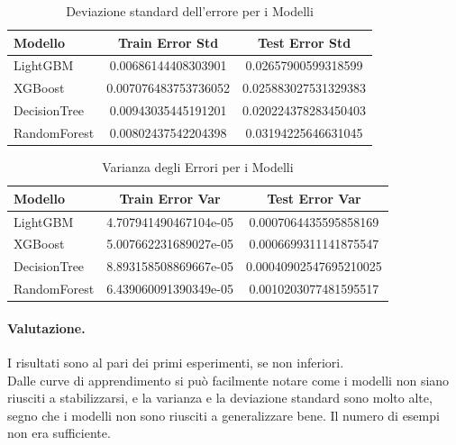 \begin{table}[H]
    \centering
    \begin{tabular}{lcc}
    \toprule
    \textbf{Modello} & \textbf{Train Error Std} & \textbf{Test Error Std} \\
    \midrule
    LightGBM & 0.00686144408303901 & 0.02657900599318599 \\
    XGBoost & 0.007076483753736052 & 0.025883027531329383 \\
    DecisionTree & 0.00943035445191201 & 0.020224378283450403 \\
    RandomForest & 0.00802437542204398 & 0.03194225646631045 \\
    \bottomrule
    \end{tabular}
    \caption{Deviazione standard dell'errore per i Modelli}
    
\end{table}

\begin{table}[H]
    \centering
    \begin{tabular}{lcc}
    \toprule
    \textbf{Modello} & \textbf{Train Error Var} & \textbf{Test Error Var} \\
    \midrule
    LightGBM & 4.707941490467104e-05 & 0.0007064435595858169 \\
    XGBoost & 5.007662231689027e-05 & 0.0006699311141875547\\
    DecisionTree & 8.893158508869667e-05 & 0.00040902547695210025 \\
    RandomForest & 6.439060091390349e-05 & 0.0010203077481595517\\
    \bottomrule
    \end{tabular}
    \caption{Varianza degli Errori per i Modelli}
    
\end{table}

\paragraph{Valutazione.} I risultati sono al pari dei primi esperimenti, se non inferiori. \\ Dalle curve di apprendimento si può facilmente notare come i modelli non siano riusciti a stabilizzarsi, e la varianza e la deviazione standard sono molto alte, segno che i modelli non sono riusciti a generalizzare bene. Il numero di esempi non era sufficiente.

